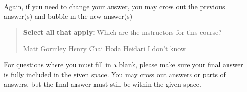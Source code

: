 \documentclass[11pt,addpoints,answers]{exam}
\begin{document}
Again, if you need to change your answer, you may cross out the previous answer(s) and bubble in the new answer(s):

\begin{quote}
\textbf{Select all that apply:} Which are the instructors for this course?
    {%
    \checkboxchar{\xcancel{$\blacksquare$}} \checkedchar{$\blacksquare$} %
    \begin{checkboxes}
    \CorrectChoice Matt Gormley 
    \CorrectChoice Henry Chai
    \CorrectChoice Hoda Heidari
    \choice I don't know
    \end{checkboxes}
    }
\end{quote}

For questions where you must fill in a blank, please make sure your final answer is fully included in the given space. You may cross out answers or parts of answers, but the final answer must still be within the given space.
\end{document}
